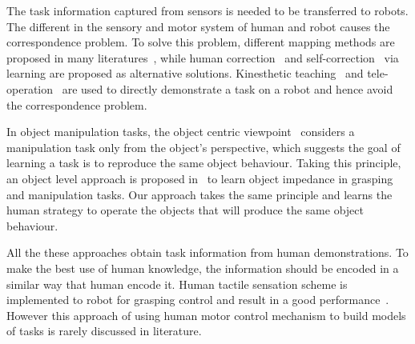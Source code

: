 \documentclass[preprint,12pt]{elsarticle}
\begin{document}
The task information captured from sensors is needed to be transferred to robots. The different in the sensory and motor system of human and robot causes the correspondence problem.
To solve this problem, different mapping methods are proposed in many literatures~\cite{asfour2008imitation,koenemann2012whole,kulic2012incremental}, while human correction~\cite{calinon2007incremental,sauser2011iterative,romano2011human} and self-correction~\cite{bidan2013robio} via learning are proposed as alternative solutions. Kinesthetic teaching~\cite{korkinof2013online,pais2014encoding} and tele-operation~\cite{Fischer98} are used to directly demonstrate a task on a robot and hence avoid the correspondence problem.

In object manipulation tasks, the object centric viewpoint~\cite{okamura2000overview} considers a manipulation task only from the object's perspective, which suggests the goal of learning a task is to reproduce the same object behaviour. Taking this principle, an object level approach is proposed in~\cite{Miao2014} to learn object impedance in grasping and manipulation tasks. Our approach takes the same principle and learns the human strategy to operate the objects that will produce the same object behaviour.

All the these approaches obtain task information from human demonstrations. To make the best use of human knowledge, the information should be encoded in a similar way that human encode it. Human tactile sensation scheme is implemented to robot for grasping control and result in a good performance~\cite{romano2011human}. However this approach of using human motor control mechanism to build models of tasks is rarely discussed in literature.



\end{document}

